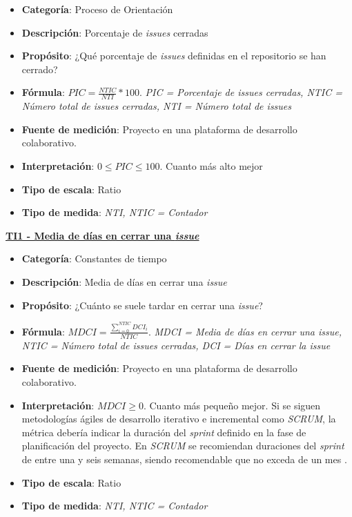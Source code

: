 \begin{itemize}
	\item \textbf{Categoría}: Proceso de Orientación
	\item \textbf{Descripción}: Porcentaje de \textit{issues} cerradas
	\item \textbf{Propósito}: ¿Qué porcentaje de \textit{issues} definidas en el repositorio se han cerrado?
	\item \textbf{Fórmula}: $PIC = \frac{NTIC}{NTI}*100$. \textit{PIC = Porcentaje de \textit{issues} cerradas, NTIC = Número total de \textit{issues} cerradas, NTI = Número total de \textit{issues}}
	\item \textbf{Fuente de medición}: Proyecto en una plataforma de desarrollo colaborativo.
	\item \textbf{Interpretación}: $0 \leq PIC \leq 100$. Cuanto más alto mejor
	\item \textbf{Tipo de escala}: Ratio
	\item \textbf{Tipo de medida}: \textit{NTI, NTIC = Contador}
\end{itemize}

\textbf{\underline{TI1 - Media de días en cerrar una \textit{issue}}}

\begin{itemize}
	\item \textbf{Categoría}: Constantes de tiempo
	\item \textbf{Descripción}:  Media de días en cerrar una \textit{issue}
	\item \textbf{Propósito}: ¿Cuánto se suele tardar en cerrar una \textit{issue}? 
	\item \textbf{Fórmula}: $MDCI = \frac{\sum_{i=0}^{NTIC}DCI_i}{NTIC}$. \textit{MDCI = Media de días en cerrar una \textit{issue}, NTIC = Número total de \textit{issues} cerradas, DCI = Días en cerrar la \textit{issue}}
	\item \textbf{Fuente de medición}: Proyecto en una plataforma de desarrollo colaborativo.
	\item \textbf{Interpretación}: $MDCI \geq 0$. Cuanto más pequeño mejor. Si se siguen metodologías ágiles de desarrollo iterativo e incremental como \textit{SCRUM}, la métrica debería indicar la duración del \textit{sprint} definido en la fase de planificación del proyecto. En \textit{SCRUM} se recomiendan duraciones del \textit{sprint} de entre una y seis semanas, siendo recomendable que no exceda de un mes \cite{scrum_master_scrum_2019}.
	\item \textbf{Tipo de escala}: Ratio
	\item \textbf{Tipo de medida}: \textit{NTI, NTIC = Contador}
\end{itemize}

